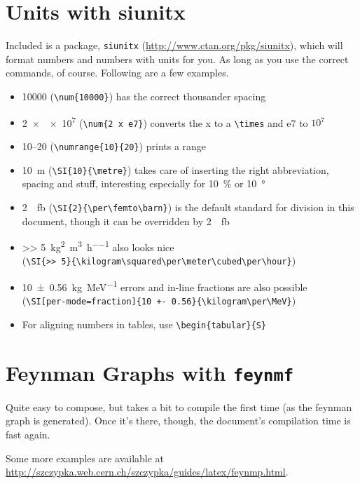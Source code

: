 \section{Units with siunitx} %
\label{sec:units_with_siunitx}
Included is a package, \texttt{siunitx} (\url{http://www.ctan.org/pkg/siunitx}), which will format numbers and numbers with units for you. As long as you use the correct commands, of course. Following are a few examples.
\begin{itemize}
	\item \num{10000} (\verb|\num{10000}|) has the correct thousander spacing
	\item \num{2 x e7} (\verb|\num{2 x e7}|) converts the x to a \verb|\times| and e7 to $10^7$
	\item \numrange{10}{20} (\verb|\numrange{10}{20}|) prints a range
	\item \SI{10}{\metre} (\verb|\SI{10}{\metre}|) takes care of inserting the right abbreviation, spacing and stuff, interesting especially for \SI{10}{\percent} or \SI{10}{\degree}
	\item \SI{2}{\per\femto\barn} (\verb|\SI{2}{\per\femto\barn}|) is the default standard for division in this document, though it can be overridden by \SI[per-mode=reciprocal]{2}{\per\femto\barn}
	\item \SI{>> 5}{\kilogram\squared\per\meter\cubed\per\hour} also looks nice \\
	(\verb|\SI{>> 5}{\kilogram\squared\per\meter\cubed\per\hour}|)
	\item \SI[per-mode=fraction]{10 +- 0.56}{\kilogram\per\MeV} errors and in-line fractions are also possible\\
	(\verb|\SI[per-mode=fraction]{10 +- 0.56}{\kilogram\per\MeV}|) 
	\item For aligning numbers in tables, use \verb|\begin{tabular}{S}|
\end{itemize}

\section{Feynman Graphs with \texttt{feynmf}} %
\label{sec:feynman_graphs_with_feynmf}
Quite easy to compose, but takes a bit to compile the first time (as the feynman graph is generated). Once it's there, though, the document's compilation time is fast again.

Some more examples are available at\newline
\url{http://szczypka.web.cern.ch/szczypka/guides/latex/feynmp.html}.


